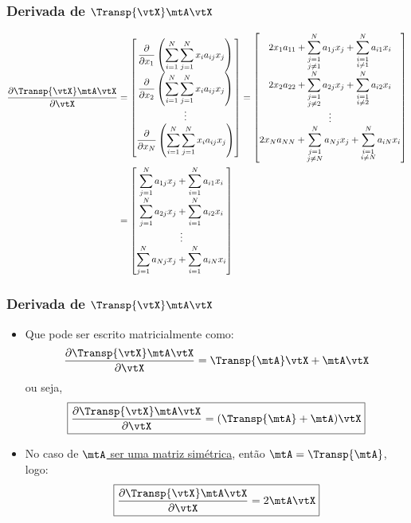 \begin{frame}
	\frametitle{\normalsize Derivada de $\Transp{\vtX} \mtA \vtX$}
	{\tiny
	\begin{align*}
		\frac{\partial \Transp{\vtX} \mtA \vtX}{\partial \vtX} &= \begin{bmatrix}
			\displaystyle \frac{\partial}{\partial x_1} \left( \sum_{i = 1}^{N}\sum_{j = 1}^{N} x_{i} a_{ij} x_{j} \right) \\ 
			\displaystyle  \frac{\partial}{\partial x_2} \left( \sum_{i = 1}^{N}\sum_{j = 1}^{N} x_{i} a_{ij} x_{j} \right) \\ 
			\vdots \\ 
			\displaystyle \frac{\partial}{\partial x_N} \left( \sum_{i = 1}^{N}\sum_{j = 1}^{N} x_{i} a_{ij} x_{j} \right) 
		\end{bmatrix} 
		= \begin{bmatrix}
			\displaystyle 2x_1a_{11} + \sum_{\substack{j = 1 \\ j \neq 1}}^{N} a_{1j} x_{j} + \sum_{\substack{i = 1 \\ i \neq 1}}^{N} a_{i1} x_{i} \\
			\displaystyle 2x_2a_{22} + \sum_{\substack{j = 1 \\ j \neq 2}}^{N} a_{2j} x_{j} + \sum_{\substack{i = 1 \\ i \neq 2}}^{N} a_{i2} x_{i} \\
			\vdots \\
			\displaystyle 2x_Na_{NN} + \sum_{\substack{j = 1 \\ j \neq N}}^{N} a_{Nj} x_{j} + \sum_{\substack{i = 1 \\ i \neq N}}^{N} a_{iN} x_{i} 
		\end{bmatrix} \\
		&= \begin{bmatrix}
			\displaystyle \sum_{j = 1}^{N} a_{1j} x_{j} + \sum_{i = 1}^{N} a_{i1} x_{i} \\
			\displaystyle \sum_{j = 1}^{N} a_{2j} x_{j} + \sum_{i = 1}^{N} a_{i2} x_{i} \\
			\vdots \\
			\displaystyle \sum_{j = 1}^{N} a_{Nj} x_{j} + \sum_{i = 1}^{N} a_{iN} x_{i} 
		\end{bmatrix} 
	\end{align*}}
\end{frame}

\begin{frame}
	\frametitle{\normalsize Derivada de $\Transp{\vtX} \mtA \vtX$}
	\begin{itemize}
		\item Que pode ser escrito matricialmente como:
		\[
			\frac{\partial \Transp{\vtX} \mtA \vtX}{\partial \vtX} = \Transp{\mtA} \vtX + \mtA \vtX
		\]
		ou seja,
		\[
			\boxed{\frac{\partial \Transp{\vtX} \mtA \vtX}{\partial \vtX} = (\Transp{\mtA} + \mtA) \vtX}
		\]
		\item No caso de \underline{$\mtA$ ser uma matriz simétrica}, então $\mtA = \Transp{\mtA}$, logo:
		\[
			\boxed{\frac{\partial \Transp{\vtX} \mtA \vtX}{\partial \vtX} = 2\mtA \vtX}
		\]
	\end{itemize}
\end{frame}

